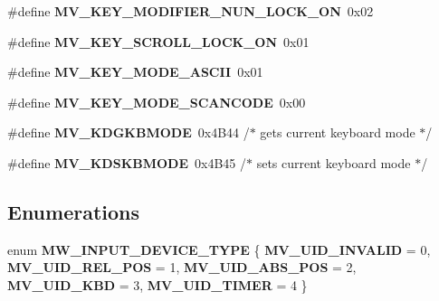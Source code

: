\begin{DoxyCompactItemize}
\#define {\bfseries M\+V\+\_\+\+K\+E\+Y\+\_\+\+M\+O\+D\+I\+F\+I\+E\+R\+\_\+\+N\+U\+N\+\_\+\+L\+O\+C\+K\+\_\+\+ON}~0x02
\item 
\mbox{\label{group__libmisc__fb__mw_gaaaa92a16f095dedd826b1783a2541dad}} 
\#define {\bfseries M\+V\+\_\+\+K\+E\+Y\+\_\+\+S\+C\+R\+O\+L\+L\+\_\+\+L\+O\+C\+K\+\_\+\+ON}~0x01
\item 
\mbox{\label{group__libmisc__fb__mw_ga64838deb5c9f227c1492151508d27315}} 
\#define {\bfseries M\+V\+\_\+\+K\+E\+Y\+\_\+\+M\+O\+D\+E\+\_\+\+A\+S\+C\+II}~0x01
\item 
\mbox{\label{group__libmisc__fb__mw_ga92d7141d4e3374dd5573b56bff12b0c2}} 
\#define {\bfseries M\+V\+\_\+\+K\+E\+Y\+\_\+\+M\+O\+D\+E\+\_\+\+S\+C\+A\+N\+C\+O\+DE}~0x00
\item 
\mbox{\label{group__libmisc__fb__mw_ga6c28af2e5967bc216c3c3dbfeaa7e676}} 
\#define {\bfseries M\+V\+\_\+\+K\+D\+G\+K\+B\+M\+O\+DE}~0x4\+B44   /$\ast$ gets current keyboard mode $\ast$/
\item 
\mbox{\label{group__libmisc__fb__mw_gaca4cbaaf85484de094afb6bbad1d092f}} 
\#define {\bfseries M\+V\+\_\+\+K\+D\+S\+K\+B\+M\+O\+DE}~0x4\+B45   /$\ast$ sets current keyboard mode $\ast$/
\end{DoxyCompactItemize}
\subsection*{Enumerations}
\begin{DoxyCompactItemize}
\item 
\mbox{\label{group__libmisc__fb__mw_ga2e75968effeec454ae088b45abcde87a}} 
enum {\bfseries M\+W\+\_\+\+I\+N\+P\+U\+T\+\_\+\+D\+E\+V\+I\+C\+E\+\_\+\+T\+Y\+PE} \{ \newline
{\bfseries M\+V\+\_\+\+U\+I\+D\+\_\+\+I\+N\+V\+A\+L\+ID} = 0, 
{\bfseries M\+V\+\_\+\+U\+I\+D\+\_\+\+R\+E\+L\+\_\+\+P\+OS} = 1, 
{\bfseries M\+V\+\_\+\+U\+I\+D\+\_\+\+A\+B\+S\+\_\+\+P\+OS} = 2, 
{\bfseries M\+V\+\_\+\+U\+I\+D\+\_\+\+K\+BD} = 3, 
\newline
{\bfseries M\+V\+\_\+\+U\+I\+D\+\_\+\+T\+I\+M\+ER} = 4
 \}
\end{DoxyCompactItemize}
